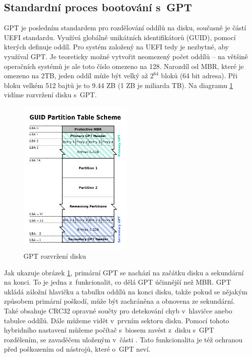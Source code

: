 \subsection{Standardní proces bootování s~GPT}

GPT je posledním standardem pro rozdělování oddílů na disku, současně je částí UEFI standardu. Využívá globálně unikátních identifikátorů (GUID), pomocí kterých definuje oddíl. Pro systém založený na UEFI tedy je nezbytné, aby využíval GPT. Je teoreticky možné vytvořit neomezený počet oddílů -- na většině operačních systémů je ale toto číslo omezeno na 128. Narozdíl od MBR, které je omezeno na 2TB, jeden oddíl může být velký až $ 2^{64} $ bloků (64 bit adresa). Při bloku velkém 512 bajtů je to 9.44 ZB (1 ZB je miliarda TB). Na diagramu \ref{gpt-pic} vidíme rozvržení disku s~GPT.
\newpage

\begin{figure}[h]\centering
\includegraphics[width=0.5\textwidth]{files/gpt-partition-scheme.png}
	\caption{GPT rozvržení disku \cite{gpt-mbr-pic}}\label{gpt-pic}
\end{figure}

Jak ukazuje obrázek \ref{gpt-pic}, primární GPT se nachází na začátku disku a sekundární na konci. To je jedna z~funkcionalit, co dělá GPT účinnější než MBR. GPT ukládá záložní hlavičku a tabulku oddílů na konci disku, takže pokud se nějakým způsobem primární poškodí, může být zachráněna a obnovena ze sekundární. Také obsahuje CRC32 opravné součty pro detekování chyb v~hlavičce anebo tabulce oddílů. Dále můžeme vidět  v~prvním sektoru disku. Pomocí tohoto hybridního nastavení můžeme počítač s~biosem zavést z~disku s~GPT rozdělením, se zavaděčem uloženým v~části . Tato funkcionalita je též ochranou před poškozením od nástrojů, které o~GPT neví.
